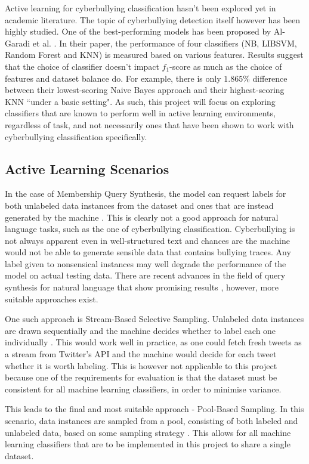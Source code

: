 \documentclass[a4paper,12pt]{article}
\begin{document}
Active learning for cyberbullying classification hasn't been explored yet in academic literature. The topic of cyberbullying detection itself however has been highly studied. One of the best-performing models has been proposed by Al-Garadi et al. \cite{garadi-highestf/top10features}. In their paper, the performance of four classifiers (NB, LIBSVM, Random Forest and KNN) is measured based on various features. Results suggest that the choice of classifier doesn't impact $f_1$-score as much as the choice of features and dataset balance do. For example, there is only $1.865\%$ difference between their lowest-scoring Naive Bayes approach and their highest-scoring KNN ``under a basic setting". As such, this project will focus on exploring classifiers that are known to perform well in active learning environments, regardless of task, and not necessarily ones that have been shown to work with cyberbullying classification specifically.
\subsection{Active Learning Scenarios}
In the case of Membership Query Synthesis, the model can request labels for both unlabeled data instances from the dataset and ones that are instead generated by the machine \cite{Settles2009}. This is clearly not a good approach for natural language tasks, such as the one of cyberbullying classification. Cyberbullying is not always apparent even in well-structured text and chances are the machine would not be able to generate sensible data that contains bullying traces. Any label given to nonsensical instances may well degrade the performance of the model on actual testing data. There are recent advances in the field of query synthesis for natural language that show promising results \cite{schumann-rehbein-2019-active}, however, more suitable approaches exist.

One such approach is Stream-Based Selective Sampling. Unlabeled data instances are drawn sequentially and the machine decides whether to label each one individually \cite{Settles2009}. This would work well in practice, as one could fetch fresh tweets as a stream from Twitter's API and the machine would decide for each tweet whether it is worth labeling. This is however not applicable to this project because one of the requirements for evaluation is that the dataset must be consistent for all machine learning classifiers, in order to minimise variance.

This leads to the final and most suitable approach - Pool-Based Sampling. In this scenario, data instances are sampled from a pool, consisting of both labeled and unlabeled data, based on some sampling strategy \cite{Settles2009}. This allows for all machine learning classifiers that are to be implemented in this project to share a single dataset.
\end{document}
